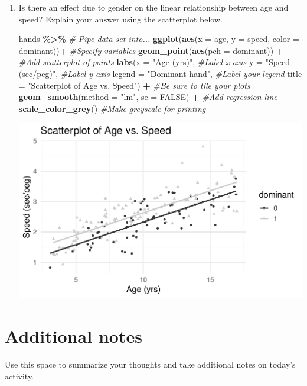 \documentclass[
]{report}
\newenvironment{Shaded}{\begin{snugshade}}{\end{snugshade}}
\newcommand{\CommentTok}[1]{\textcolor[rgb]{0.56,0.35,0.01}{\textit{#1}}}
\newcommand{\DataTypeTok}[1]{\textcolor[rgb]{0.13,0.29,0.53}{#1}}
\newcommand{\KeywordTok}[1]{\textcolor[rgb]{0.13,0.29,0.53}{\textbf{#1}}}
\newcommand{\NormalTok}[1]{#1}
\newcommand{\OperatorTok}[1]{\textcolor[rgb]{0.81,0.36,0.00}{\textbf{#1}}}
\newcommand{\OtherTok}[1]{\textcolor[rgb]{0.56,0.35,0.01}{#1}}
\newcommand{\StringTok}[1]{\textcolor[rgb]{0.31,0.60,0.02}{#1}}
\begin{document}
\begin{enumerate}
\def\labelenumi{\arabic{enumi}.}
\setcounter{enumi}{19}
\item
  Is there an effect due to gender on the linear relationship between age and speed? Explain your answer using the scatterplot below.

\begin{Shaded}
\begin{Highlighting}[]
\NormalTok{hands }\OperatorTok{\%\textgreater{}\%}\StringTok{ }\CommentTok{\# Pipe data set into...}
\KeywordTok{ggplot}\NormalTok{(}\KeywordTok{aes}\NormalTok{(}\DataTypeTok{x =}\NormalTok{ age, }\DataTypeTok{y =}\NormalTok{ speed, }\DataTypeTok{color =}\NormalTok{ dominant))}\OperatorTok{+}\StringTok{  }\CommentTok{\#Specify variables}
\StringTok{  }\KeywordTok{geom\_point}\NormalTok{(}\KeywordTok{aes}\NormalTok{(}\DataTypeTok{pch =}\NormalTok{ dominant)) }\OperatorTok{+}\StringTok{  }\CommentTok{\#Add scatterplot of points}
\StringTok{  }\KeywordTok{labs}\NormalTok{(}\DataTypeTok{x =} \StringTok{"Age (yrs)"}\NormalTok{,  }\CommentTok{\#Label x{-}axis}
       \DataTypeTok{y =} \StringTok{"Speed (sec/peg)"}\NormalTok{,  }\CommentTok{\#Label y{-}axis}
       \DataTypeTok{legend =} \StringTok{"Dominant hand"}\NormalTok{,  }\CommentTok{\#Label your legend}
       \DataTypeTok{title =} \StringTok{"Scatterplot of Age vs. Speed"}\NormalTok{) }\OperatorTok{+}\StringTok{ }\CommentTok{\#Be sure to tile your plots}
\StringTok{  }\KeywordTok{geom\_smooth}\NormalTok{(}\DataTypeTok{method =} \StringTok{"lm"}\NormalTok{, }\DataTypeTok{se =} \OtherTok{FALSE}\NormalTok{) }\OperatorTok{+}\StringTok{  }\CommentTok{\#Add regression line}
\StringTok{  }\KeywordTok{scale\_color\_grey}\NormalTok{() }\CommentTok{\#Make greyscale for printing }
\end{Highlighting}
\end{Shaded}

  \begin{center}\includegraphics[width=0.7\linewidth]{10-regression_files/figure-latex/unnamed-chunk-6-1} \end{center}
\end{enumerate}

\hypertarget{additional-notes}{%
\section{Additional notes}\label{additional-notes}}

Use this space to summarize your thoughts and take additional notes on today's activity.
\end{document}
